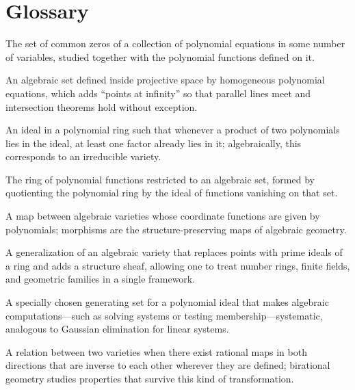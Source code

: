\section*{Glossary}
\begin{description}[leftmargin=*,style=nextline,itemsep=0.3em]

\item[\textbf{Affine variety.}] The set of common zeros of a collection of polynomial equations in some number of variables, studied together with the polynomial functions defined on it.

\item[\textbf{Projective variety.}] An algebraic set defined inside projective space by homogeneous polynomial equations, which adds ``points at infinity'' so that parallel lines meet and intersection theorems hold without exception.

\item[\textbf{Prime ideal.}] An ideal in a polynomial ring such that whenever a product of two polynomials lies in the ideal, at least one factor already lies in it; algebraically, this corresponds to an irreducible variety.

\item[\textbf{Coordinate ring.}] The ring of polynomial functions restricted to an algebraic set, formed by quotienting the polynomial ring by the ideal of functions vanishing on that set.

\item[\textbf{Morphism.}] A map between algebraic varieties whose coordinate functions are given by polynomials; morphisms are the structure-preserving maps of algebraic geometry.

\item[\textbf{Scheme.}] A generalization of an algebraic variety that replaces points with prime ideals of a ring and adds a structure sheaf, allowing one to treat number rings, finite fields, and geometric families in a single framework.

\item[\textbf{Gr\"obner basis.}] A specially chosen generating set for a polynomial ideal that makes algebraic computations---such as solving systems or testing membership---systematic, analogous to Gaussian elimination for linear systems.

\item[\textbf{Birational equivalence.}] A relation between two varieties when there exist rational maps in both directions that are inverse to each other wherever they are defined; birational geometry studies properties that survive this kind of transformation.


\end{description}
